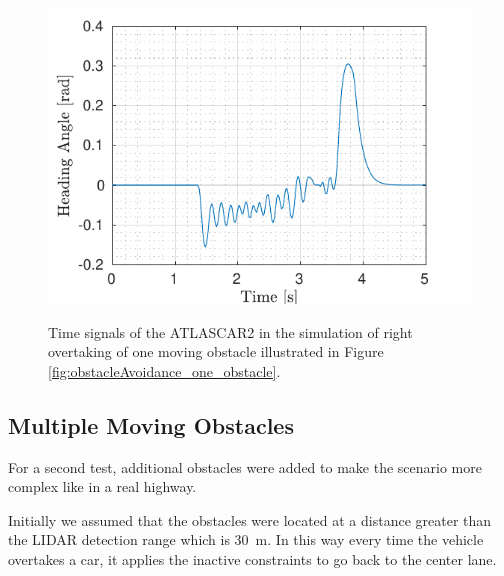 \begin{figure}[!t]
\begin{minipage}[t]{0.5\textwidth}
		\subcaption{}\label{fig:delta_one_moving}
	\end{minipage}
	\begin{minipage}[t]{0.5\textwidth}
		\includegraphics[width=\textwidth]{../../MATLAB/one_obstacle_right_overtaking/figure/HeadingAngleVsTime.pdf}
		\subcaption{}\label{fig:theta_one_moving}
	\end{minipage}
	\caption{Time signals of the ATLASCAR2 in the simulation of right overtaking of one moving obstacle illustrated in Figure \ref{fig:obstacleAvoidance_one_obstacle}.}
	\label{fig:components_one_moving_obstacle}
\end{figure}


%
\subsection{Multiple Moving Obstacles}
For a second test, additional obstacles were added to make the scenario more complex like in a real highway.

Initially we assumed that the obstacles were located at a distance greater than the LIDAR detection range which is \SI{30}{m}. In this way every time the vehicle overtakes a car, it applies the inactive constraints to go back to the center lane. 

